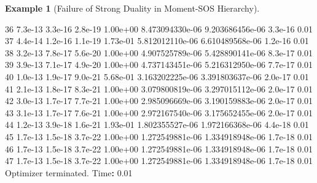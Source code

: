 \documentclass[
]{book}
\newenvironment{Shaded}{\begin{snugshade}}{\end{snugshade}}
\newcommand{\FloatTok}[1]{\textcolor[rgb]{0.00,0.00,0.81}{#1}}
\newcommand{\NormalTok}[1]{#1}
\newcommand{\OperatorTok}[1]{\textcolor[rgb]{0.81,0.36,0.00}{\textbf{#1}}}
\newcommand{\VariableTok}[1]{\textcolor[rgb]{0.00,0.00,0.00}{#1}}
\theoremstyle{definition}
\theoremstyle{definition}
\newtheorem{example}{Example}[chapter]
\theoremstyle{definition}
\theoremstyle{definition}
\theoremstyle{remark}
\begin{document}
\begin{example}[Failure of Strong Duality in Moment-SOS Hierarchy]
\begin{Shaded}
\begin{Highlighting}[]
\FloatTok{36}  \FloatTok{7.3e{-}13}  \FloatTok{3.3e{-}16}  \FloatTok{2.8e{-}19}  \FloatTok{1.00e+00}   \FloatTok{8.473094330e{-}06}   \FloatTok{9.203686456e{-}06}   \FloatTok{3.3e{-}16}  \FloatTok{0.01}  
\FloatTok{37}  \FloatTok{4.4e{-}14}  \FloatTok{1.2e{-}16}  \FloatTok{1.1e{-}19}  \FloatTok{1.73e{-}01}   \FloatTok{5.812012110e{-}06}   \FloatTok{6.610489568e{-}06}   \FloatTok{1.2e{-}16}  \FloatTok{0.01}  
\FloatTok{38}  \FloatTok{3.2e{-}13}  \FloatTok{7.8e{-}17}  \FloatTok{5.6e{-}20}  \FloatTok{1.00e+00}   \FloatTok{4.907525789e{-}06}   \FloatTok{5.428890141e{-}06}   \FloatTok{8.3e{-}17}  \FloatTok{0.01}  
\FloatTok{39}  \FloatTok{3.9e{-}13}  \FloatTok{7.1e{-}17}  \FloatTok{4.9e{-}20}  \FloatTok{1.00e+00}   \FloatTok{4.737143451e{-}06}   \FloatTok{5.216312950e{-}06}   \FloatTok{7.7e{-}17}  \FloatTok{0.01}  
\FloatTok{40}  \FloatTok{1.0e{-}13}  \FloatTok{1.9e{-}17}  \FloatTok{9.0e{-}21}  \FloatTok{5.68e{-}01}   \FloatTok{3.163202225e{-}06}   \FloatTok{3.391803637e{-}06}   \FloatTok{2.0e{-}17}  \FloatTok{0.01}  
\FloatTok{41}  \FloatTok{2.1e{-}13}  \FloatTok{1.8e{-}17}  \FloatTok{8.3e{-}21}  \FloatTok{1.00e+00}   \FloatTok{3.079800819e{-}06}   \FloatTok{3.297015112e{-}06}   \FloatTok{2.0e{-}17}  \FloatTok{0.01}  
\FloatTok{42}  \FloatTok{3.0e{-}13}  \FloatTok{1.7e{-}17}  \FloatTok{7.7e{-}21}  \FloatTok{1.00e+00}   \FloatTok{2.985096669e{-}06}   \FloatTok{3.190159883e{-}06}   \FloatTok{2.0e{-}17}  \FloatTok{0.01}  
\FloatTok{43}  \FloatTok{3.1e{-}13}  \FloatTok{1.7e{-}17}  \FloatTok{7.6e{-}21}  \FloatTok{1.00e+00}   \FloatTok{2.972167540e{-}06}   \FloatTok{3.175652455e{-}06}   \FloatTok{2.0e{-}17}  \FloatTok{0.01}  
\FloatTok{44}  \FloatTok{1.2e{-}13}  \FloatTok{3.9e{-}18}  \FloatTok{1.6e{-}21}  \FloatTok{1.93e{-}01}   \FloatTok{1.802355527e{-}06}   \FloatTok{1.972166368e{-}06}   \FloatTok{4.4e{-}18}  \FloatTok{0.01}  
\FloatTok{45}  \FloatTok{1.7e{-}13}  \FloatTok{1.5e{-}18}  \FloatTok{3.7e{-}22}  \FloatTok{1.00e+00}   \FloatTok{1.272549881e{-}06}   \FloatTok{1.334918948e{-}06}   \FloatTok{1.7e{-}18}  \FloatTok{0.01}  
\FloatTok{46}  \FloatTok{1.7e{-}13}  \FloatTok{1.5e{-}18}  \FloatTok{3.7e{-}22}  \FloatTok{1.00e+00}   \FloatTok{1.272549881e{-}06}   \FloatTok{1.334918948e{-}06}   \FloatTok{1.7e{-}18}  \FloatTok{0.01}  
\FloatTok{47}  \FloatTok{1.7e{-}13}  \FloatTok{1.5e{-}18}  \FloatTok{3.7e{-}22}  \FloatTok{1.00e+00}   \FloatTok{1.272549881e{-}06}   \FloatTok{1.334918948e{-}06}   \FloatTok{1.7e{-}18}  \FloatTok{0.01}  
\VariableTok{Optimizer} \VariableTok{terminated}\NormalTok{. }\VariableTok{Time}\OperatorTok{:} \FloatTok{0.01}    



\end{Highlighting}
\end{Shaded}
\end{example}
\end{document}
